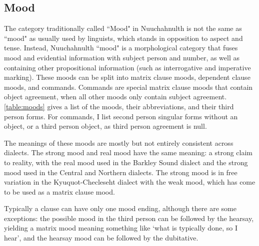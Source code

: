 \subsection{Mood} \label{sec:grams:mood}

The category traditionally called ``Mood" in Nuuchahnulth is not the same as ``mood" as usually used by linguists, which stands in opposition to aspect and tense. Instead, Nuuchahnulth ``mood" is a morphological category that fuses mood and evidential information with subject person and number, as well as containing other propositional information (such as interrogative and imperative marking). These moods can be split into matrix clause moods, dependent clause moods, and commands. Commands are special matrix clause moods that contain object agreement, when all other moods only contain subject agreement. \cref{table:moods} gives a list of the moods, their abbreviations, and their third person forms. For commands, I list second person singular forms without an object, or a third person object, as third person agreement is null.

The meanings of these moods are mostly but not entirely consistent across dialects. The strong mood and real mood have the same meaning: a strong claim to reality, with the real mood used in the Barkley Sound dialect and the strong mood used in the Central and Northern dialects. The strong mood is in free variation in the Kyuquot-Checleseht dialect with the weak mood, which has come to be used as a matrix clause mood.

Typically a clause can have only one mood ending, although there are some exceptions: the possible mood in the third person can be followed by the hearsay, yielding a matrix mood meaning something like `what is typically done, so I hear', and the hearsay mood can be followed by the dubitative.

\newpage

